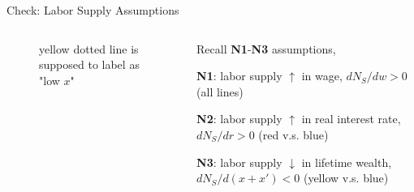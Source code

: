 \documentclass[11pt,aspectratio=169,usenames,dvipsnames]{beamer}
\let\tempone\itemize
\let\temptwo\enditemize
\renewenvironment{itemize}{\tempone\addtolength{\itemsep}{\fill}}{\temptwo}
\begin{document}
\begin{frame}{Check: Labor Supply Assumptions}
\label{slide:Check__Labor_Supply_Assumptions}
    \begin{columns}
        \begin{column}{0.5\textwidth}
            \begin{figure}
                \caption{yellow dotted line is supposed to label as "low $ x $"}
            \end{figure}
        \end{column}
        \begin{column}{0.5\textwidth}
            Recall \textbf{N1}-\textbf{N3} assumptions,
            \begin{itemize}
                \item \textbf{N1}: labor supply $ \uparrow  $ in wage, $ d N_{S} / dw > 0 $ (all lines)
                \item \textbf{N2}: labor supply $ \uparrow  $ in real interest rate, $ d N_{S} / dr > 0 $ (red v.s. blue)
                \item \textbf{N3}: labor supply $ \downarrow  $ in lifetime wealth, $ d N_{S} / d( x + x' ) < 0 $ (yellow v.s. blue)
            \end{itemize}
        \end{column}
    \end{columns}
\end{frame}
\end{document}
